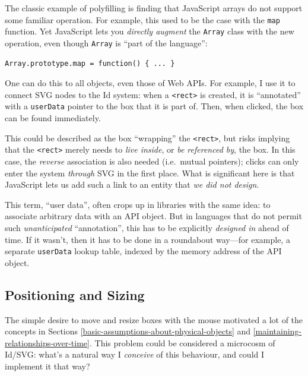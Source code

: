 The classic example of polyfilling is finding that JavaScript arrays do
not support some familiar operation. For example, this used to be the
case with the \texttt{map} function. Yet JavaScript lets you
\emph{directly augment} the \texttt{Array} class with the new operation,
even though \texttt{Array} is ``part of the language'':

\begin{lstlisting}
Array.prototype.map = function() { ... }
\end{lstlisting}

One can do this to all objects, even those of Web APIs. For example, I
use it to connect SVG nodes to the Id{} system: when a
\texttt{\textless{}rect\textgreater{}} is created, it is ``annotated''
with a \texttt{userData} pointer to the box that it is part of. Then,
when clicked, the box can be found immediately.

This could be described as the box ``wrapping'' the
\texttt{\textless{}rect\textgreater{}}, but risks implying that the
\texttt{\textless{}rect\textgreater{}} merely needs to \emph{live
inside}, or \emph{be referenced by}, the box. In this case, the
\emph{reverse} association is also needed (i.e.~mutual pointers); clicks
can only enter the system \emph{through} SVG in the first place. What is
significant here is that JavaScript lets us add such a link to an entity
that \emph{we did not design}.

This term, ``user data'', often crops up in libraries with the same
idea: to associate arbitrary data with an API object. But in languages
that do not permit such \emph{unanticipated} ``annotation'', this has to
be explicitly \emph{designed in} ahead of time. If it wasn't, then it
has to be done in a roundabout way---for example, a separate
\texttt{userData} lookup table, indexed by the memory address of the API
object.

\hypertarget{positioning-and-sizing}{%
\subsection{Positioning and Sizing}\label{positioning-and-sizing}}

The simple desire to move and resize boxes with the mouse motivated a
lot of the concepts in Sections
\ref{basic-assumptions-about-physical-objects} and
\ref{maintaining-relationships-over-time}. This problem could be
considered a microcosm of Id{}/SVG: what's a natural way I
\emph{conceive} of this behaviour, and could I implement it that way?

